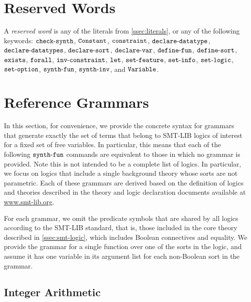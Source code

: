 \documentclass[english,a4paper,10pt]{article}
\begin{document}



\newpage
\begin{appendix}

\section{Reserved Words}
\label{apx:reserved}

A \emph{reserved word} is any of the 
literals from \cref{ssec:literals},
or any of the following keywords:
${\tt check\mbox{-}synth}$,
${\tt Constant}$,
${\tt constraint}$,
${\tt declare\mbox{-}datatype}$,
${\tt declare\mbox{-}datatypes}$,
${\tt declare\mbox{-}sort}$,
${\tt declare\mbox{-}var}$,
${\tt define\mbox{-}fun}$,
${\tt define\mbox{-}sort}$,
${\tt exists}$,
${\tt forall}$,
${\tt inv\mbox{-}constraint}$,
${\tt let}$,
${\tt set\mbox{-}feature}$,
${\tt set\mbox{-}info}$,
${\tt set\mbox{-}logic}$,
${\tt set\mbox{-}option}$,
${\tt synth\mbox{-}fun}$,
${\tt synth\mbox{-}inv}$, and
${\tt Variable}$.


\section{Reference Grammars}
\label{apx:ref-grammars}

In this section, for convenience, we provide the concrete syntax for
grammars that generate exactly the set of terms 
that belong to SMT-LIB logics of interest for a fixed set of free variables.
In particular, this means that each of the following ${\tt synth\mbox{-}fun}$
commands are equivalent to those in which no grammar is provided.
Note this is not intended to be a complete list of logics.
In particular, we focus on logics that include a single background theory
whose sorts are not parametric.
Each of these grammars are derived
based on the definition of logics and theories
described in the theory and logic declaration documents
available at \url{www.smt-lib.org}.

For each grammar, we omit 
the predicate symbols that are shared by all logics
according to the SMT-LIB standard, that is,
those included in the core theory described in \cref{ssec:smt-logic},
which includes Boolean connectives and equality.
We provide the grammar
for a single function over one of the sorts in the logic,
and assume it has one variable in its argument list
for each non-Boolean sort in the grammar.

\subsection{Integer Arithmetic}


\end{appendix}
\end{document}

